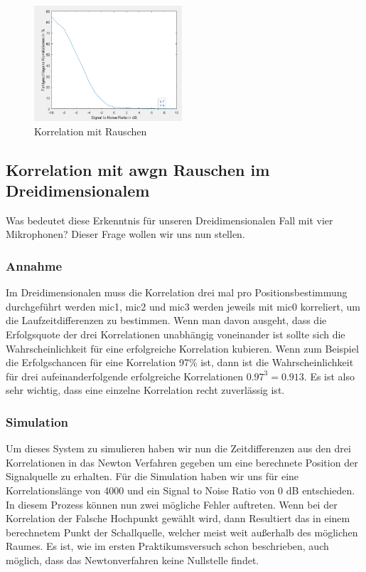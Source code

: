 \begin{figure}
\centering 
\includegraphics[width=0.49\textwidth]{Correlation mit Rauschen, (SNR) bei 4000 Segmentlaenge und 7500 corrBegin (in dB)}
\caption{Korrelation mit Rauschen} \label{fig:KorrelationAnalyseMitRauschen}
\end{figure}

\subsection{Korrelation mit awgn Rauschen im Dreidimensionalem}
Was bedeutet diese Erkenntnis für unseren Dreidimensionalen Fall mit vier Mikrophonen? Dieser Frage wollen wir uns nun stellen.

\subsubsection{Annahme}
Im Dreidimensionalen muss die Korrelation drei mal pro Positionsbestimmung durchgeführt werden mic1, mic2 und mic3 werden jeweils mit mic0 korreliert, um die Laufzeitdifferenzen zu bestimmen. Wenn man davon ausgeht, dass die Erfolgsquote der drei Korrelationen unabhängig voneinander ist sollte sich die Wahrscheinlichkeit für eine erfolgreiche Korrelation kubieren. Wenn zum Beispiel die Erfolgschancen für eine Korrelation 97\% ist, dann ist die Wahrscheinlichkeit für drei aufeinanderfolgende erfolgreiche Korrelationen $0.97^{3} = 0.913$. Es ist also sehr wichtig, dass eine einzelne Korrelation recht zuverlässig ist.

\subsubsection{Simulation}
Um dieses System zu simulieren haben wir nun die Zeitdifferenzen aus den drei Korrelationen in das Newton Verfahren gegeben um eine berechnete Position der Signalquelle zu erhalten. Für die Simulation haben wir uns für eine Korrelationslänge von 4000 und ein Signal to Noise Ratio von 0 dB entschieden. 
In diesem Prozess können nun zwei mögliche Fehler auftreten. Wenn bei der Korrelation der Falsche Hochpunkt gewählt wird, dann Resultiert das in einem berechnetem Punkt der Schallquelle, welcher meist weit außerhalb des möglichen Raumes. Es ist, wie im ersten Praktikumsversuch schon beschrieben, auch möglich, dass das Newtonverfahren keine Nullstelle findet.




